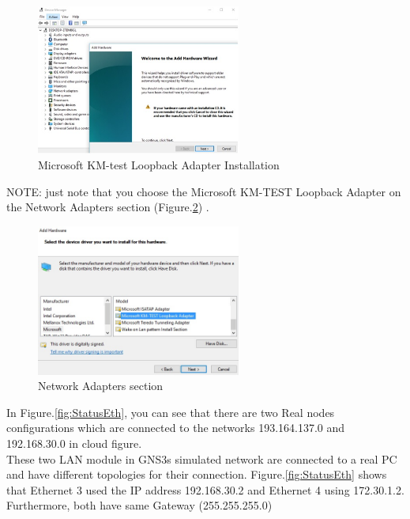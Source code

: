 \documentclass{article}
\begin{document}
\begin{figure}[H]
	\centering
		\includegraphics[width=0.6\textwidth]{LoopBackIns1.jpg}
	
	\caption{\small Microsoft KM-test Loopback Adapter Installation\newline}
	\label{fig:KMINS}
\end{figure}


NOTE: just note that you choose the Microsoft KM-TEST Loopback Adapter on the Network Adapters section (Figure.\ref{fig:KMINS2}) .


\begin{figure}[H]
	\begin{center}
		\includegraphics[width=0.6\textwidth]{LoopBackIns2.jpg}
	\end{center}
	\caption{\small Network Adapters section \newline}
	\label{fig:KMINS2}
\end{figure}


In Figure.\ref{fig:StatusEth}, you can see that there are two Real nodes configurations which are connected to the networks 193.164.137.0 and 192.168.30.0 in cloud figure.\\


These two LAN module in GNS3s simulated network are connected to a real PC and have different topologies for their connection. Figure.\ref{fig:StatusEth} shows that Ethernet 3 used the IP address 192.168.30.2 and Ethernet 4 using 172.30.1.2. Furthermore, both have same Gateway (255.255.255.0)
\end{document}
